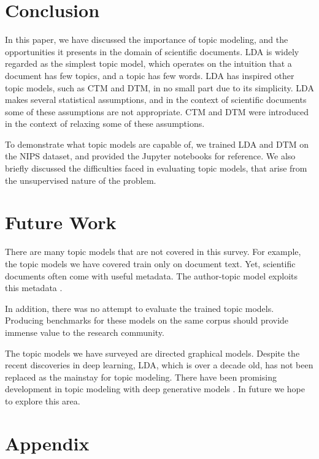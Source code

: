 \documentclass[letterpaper]{article}
\begin{document}
\section{Conclusion}
In this paper, we have discussed the importance of topic modeling, and
the opportunities it presents in the domain of scientific documents.
LDA is widely regarded as the simplest topic model, which operates on
the intuition that a document has few topics, and a topic has few
words. LDA has inspired other topic models, such as CTM and DTM, in no
small part due to its simplicity. LDA makes several statistical
assumptions, and in the context of scientific documents some of these
assumptions are not appropriate. CTM and DTM were introduced in
the context of relaxing some of these assumptions.

To demonstrate what topic models are capable of, we trained LDA and
DTM on the NIPS dataset, and provided the Jupyter notebooks for
reference. We also briefly discussed the difficulties faced in
evaluating topic models, that arise from the unsupervised nature of
the problem.

\section{Future Work}
There are many topic models that are not covered in this survey. For
example, the topic models we have covered train only on document text.
Yet, scientific documents often come with useful metadata. The
author-topic model exploits this metadata \cite{rosen2004author}.

In addition, there was no attempt to evaluate the trained topic
models. Producing benchmarks for these models on the same corpus
should provide immense value to the research community.

The topic models we have surveyed are directed graphical models.
Despite the recent discoveries in deep learning, LDA, which is over a
decade old, has not been replaced as the mainstay for topic modeling.
There have been promising development in topic modeling with deep
generative models \cite{hinton2009replicated, larochelle2012neural,
  cao2015novel}. In future we hope to explore this area.



\onecolumn

\section{Appendix}
\label{sec:appendix}
\end{document}
